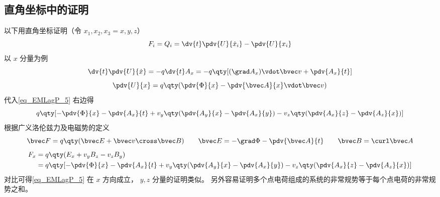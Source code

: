 \subsection{直角坐标中的证明}
以下用直角坐标证明（令 $x_1, x_2, x_3 = x,y,z$）
\begin{equation}\label{eq_EMLagP_5}
F_i = Q_i =  \dv{t} \pdv{U}{\dot x_i} - \pdv{U}{x_i}
\end{equation}
以 $x$ 分量为例
\begin{equation}
\dv{t} \pdv{U}{\dot x} =  - q\dv{t} A_x =  - q\qty[ (\grad A_x) \vdot \bvec v + \pdv{A_x}{t} ]
\end{equation}
\begin{equation}
\pdv{U}{x} = q\qty( \pdv{\Phi}{x} - \pdv{\bvec A}{x} \vdot \bvec v )
\end{equation}
代入\autoref{eq_EMLagP_5} 右边得
\begin{equation}
q\qty[ -\pdv{\Phi}{x} - \pdv{A_x}{t} + v_y \qty( \pdv{A_y}{x} - \pdv{A_x}{y} ) - v_z \qty( \pdv{A_x}{z} - \pdv{A_z}{x}) ]
\end{equation} 
根据广义洛伦兹力及电磁势的定义
\begin{equation}
\bvec F = q\qty(\bvec E + \bvec v \cross \bvec B)
\qquad
\bvec E =  - \grad \Phi  - \pdv{\bvec A}{t}
\qquad
\bvec B = \curl \bvec A
\end{equation}
\begin{equation}\begin{aligned}
F_x &= q \qty(E_x + v_y B_z - v_z B_y) \\
&= q\qty[ - \pdv{\Phi}{x} - \pdv{A_x}{t} + v_y \qty(\pdv{A_y}{x} - \pdv{A_x}{y}) - v_z \qty( \pdv{A_x}{z} - \pdv{A_z}{x}) ]
\end{aligned}\end{equation}
对比可得\autoref{eq_EMLagP_5} 在 $x$ 方向成立， $y,z$ 分量的证明类似。 另外容易证明多个点电荷组成的系统的非常规势等于每个点电荷的非常规势之和。

